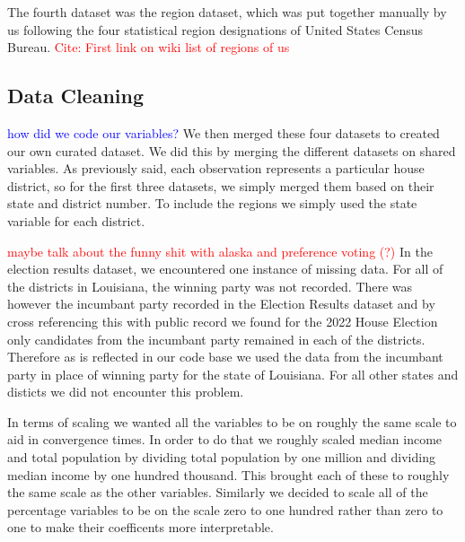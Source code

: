\documentclass[12pt]{article}
\newcommand{\red}[1]{\textcolor{red}{#1}}
\newcommand{\blue}[1]{\textcolor{blue}{#1}}
\begin{document}
The fourth dataset was the region dataset, which was put together manually by us following the four statistical region designations of United States Census Bureau. \textcolor{red}{Cite: First link on wiki list of regions of us }


\subsection*{Data Cleaning}

 \blue{how did we code our variables? }
We then merged these four datasets to created our own curated dataset. We did this by merging the different datasets on shared variables. As previously said, each observation represents a particular house district, so for the first three datasets, we simply merged them based on their state and district number. To include the regions we simply used the state variable for each district. 

\red{maybe talk about the funny shit with alaska and preference voting (?)}
In the election results dataset, we encountered one instance of missing data. For all of the districts in Louisiana, the winning party was not recorded. There was however the incumbant party recorded  in the Election Results dataset and by cross referencing this with public record we found for the 2022 House Election only candidates from the incumbant party remained in each of the districts. Therefore as is reflected in our code base we used the data from the incumbant party in place of winning party for the state of Louisiana. For all other states and disticts we did not encounter this problem. 

In terms of scaling we wanted all the variables to be on roughly the same scale to aid in convergence times. In order to do that we roughly scaled median income and total population by dividing total population by one million and dividing median income by one hundred thousand. This brought each of these to roughly the same scale as the other variables. Similarly we decided to scale all of the percentage variables to be on the scale zero to one hundred rather than zero to one to make their coefficents more interpretable.  
\end{document}
